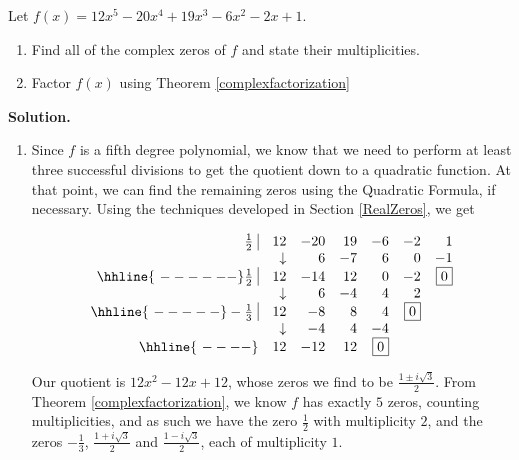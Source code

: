 \begin{ex}  Let $f(x) = 12x^5 - 20x^4+19x^3-6x^2-2x+1$.

\begin{enumerate}

\item Find all of the complex zeros of $f$ and state their multiplicities.  

\item  Factor $f(x)$ using Theorem \ref{complexfactorization}

\end{enumerate}

{ \bf Solution.}

\begin{enumerate}

\item  Since $f$ is a fifth degree polynomial, we know that we need to perform at least three successful divisions to get the quotient down to a quadratic function.  At that point, we can find the remaining zeros using the Quadratic Formula, if necessary.  Using the techniques developed in Section \ref{RealZeros}, we get

\[\begin{array}{rrrrrrr}
\frac{1}{2} \, \, \vline& 12 & -20& 19  & -6 & -2 &1 \\

  & \downarrow     &  6  &  -7  & 6 & 0 & -1\\ \hhline{~------} 

 \frac{1}{2} \, \, \vline& 12 & -14 & 12  & 0 & -2 & \fbox{$0$} \\

  & \downarrow     &  6 &  -4  & 4 & 2 &\\ \hhline{~-----} 
  
  -\frac{1}{3} \, \, \vline&  12 &  -8  & 8 & 4 &  \fbox{$0$} & \\
    
               & \downarrow &  -4  &  4  & -4  & & \\ \hhline{~----} 
 
   & 12  &   -12 & 12& \fbox{0} &&   \\
  


\end{array}\]

Our quotient is $12x^2 - 12x + 12$, whose zeros we find to be $\frac{1 \pm i \sqrt{3}}{2}$.  From Theorem \ref{complexfactorization}, we know $f$ has exactly $5$ zeros, counting multiplicities, and as such we have the zero $\frac{1}{2}$ with multiplicity $2$, and the zeros $-\frac{1}{3}$, $\frac{1 + i \sqrt{3}}{2}$ and $\frac{1 - i \sqrt{3}}{2}$, each of multiplicity $1$.


\end{enumerate}
\end{ex}
